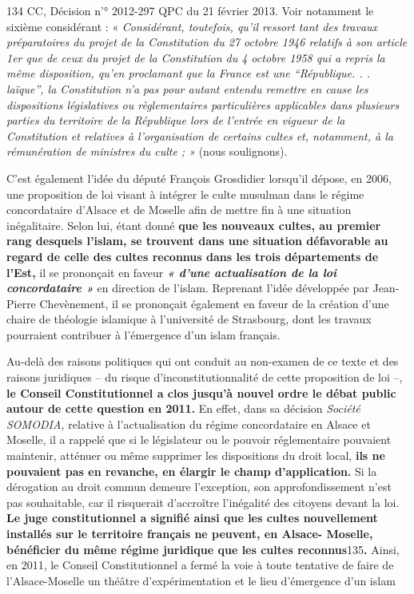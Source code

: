 134 CC, Décision n'° 2012-297 QPC du 21 février 2013. Voir notamment le
sixième considérant : « \emph{Considérant, toutefois, qu'il ressort tant
des travaux préparatoires du projet de la Constitution du 27 octobre
1946 relatifs à son article 1er que de ceux du projet de la Constitution
du 4 octobre 1958 qui a repris la même disposition, qu'en proclamant que
la France est une ``République. . . laïque'', la Constitution n'a pas
pour autant entendu remettre en cause les dispositions législatives ou
règlementaires particulières applicables dans plusieurs parties du
territoire de la République lors de l'entrée en vigueur de la
Constitution et relatives à l'organisation de certains cultes et,
notamment, à la rémunération de ministres du culte ; »} (nous
soulignons).



C'est également l'idée du député François Grosdidier lorsqu'il dépose,
en 2006, une proposition de loi visant à intégrer le culte musulman dans
le régime concordataire d'Alsace et de Moselle afin de mettre fin à une
situation inégalitaire. Selon lui, étant donné \textbf{que les nouveaux
cultes, au premier rang desquels l'islam, se trouvent dans une situation
défavorable au regard de celle des cultes reconnus dans les trois
départements de l'Est,} il se prononçait en faveur \emph{\textbf{« d'une
actualisation de la loi concordataire »}} en direction de l'islam.
Reprenant l'idée développée par Jean- Pierre Chevènement, il se
prononçait également en faveur de la création d'une chaire de théologie
islamique à l'université de Strasbourg, dont les travaux pourraient
contribuer à l'émergence d'un islam français.

Au-delà des raisons politiques qui ont conduit au non-examen de ce texte
et des raisons juridiques -- du risque d'inconstitutionnalité de cette
proposition de loi --, \textbf{le Conseil Constitutionnel a clos jusqu'à
nouvel ordre le débat public autour de cette question en 2011.} En
effet, dans sa décision \emph{Société SOMODIA,} relative à
l'actualisation du régime concordataire en Alsace et Moselle, il a
rappelé que si le législateur ou le pouvoir réglementaire pouvaient
maintenir, atténuer ou même supprimer les dispositions du droit local,
\textbf{ils ne pouvaient pas en revanche, en élargir le champ
d'application.} Si la dérogation au droit commun demeure l'exception,
son approfondissement n'est pas souhaitable, car il risquerait
d'accroître l'inégalité des citoyens devant la loi. \textbf{Le juge
constitutionnel a signifié ainsi que les cultes nouvellement installés
sur le territoire français ne peuvent, en Alsace- Moselle, bénéficier du
même régime juridique que les cultes reconnus}135\textbf{.} Ainsi, en
2011, le Conseil Constitutionnel a fermé la voie à toute tentative de
faire de l'Alsace-Moselle un théâtre d'expérimentation et le lieu
d'émergence d'un islam


